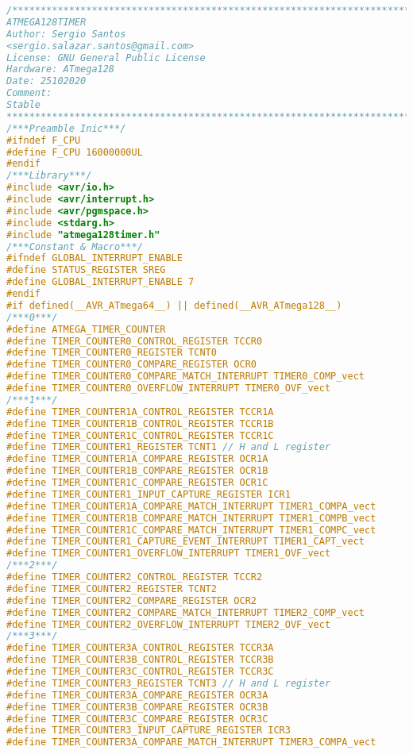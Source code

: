 \begin{lstlisting}[language=C, caption={atmega128timer.c}, label=atmega128timer-c, captionpos=b]
/*************************************************************************
ATMEGA128TIMER
Author: Sergio Santos 
<sergio.salazar.santos@gmail.com>
License: GNU General Public License
Hardware: ATmega128
Date: 25102020
Comment:
Stable
*************************************************************************/
/***Preamble Inic***/
#ifndef F_CPU
#define F_CPU 16000000UL
#endif
/***Library***/
#include <avr/io.h>
#include <avr/interrupt.h>
#include <avr/pgmspace.h>
#include <stdarg.h>
#include "atmega128timer.h"
/***Constant & Macro***/
#ifndef GLOBAL_INTERRUPT_ENABLE
#define STATUS_REGISTER SREG
#define GLOBAL_INTERRUPT_ENABLE 7
#endif
#if defined(__AVR_ATmega64__) || defined(__AVR_ATmega128__)
/***0***/
#define ATMEGA_TIMER_COUNTER
#define TIMER_COUNTER0_CONTROL_REGISTER TCCR0
#define TIMER_COUNTER0_REGISTER TCNT0
#define TIMER_COUNTER0_COMPARE_REGISTER OCR0
#define TIMER_COUNTER0_COMPARE_MATCH_INTERRUPT TIMER0_COMP_vect
#define TIMER_COUNTER0_OVERFLOW_INTERRUPT TIMER0_OVF_vect
/***1***/
#define TIMER_COUNTER1A_CONTROL_REGISTER TCCR1A
#define TIMER_COUNTER1B_CONTROL_REGISTER TCCR1B
#define TIMER_COUNTER1C_CONTROL_REGISTER TCCR1C
#define TIMER_COUNTER1_REGISTER TCNT1 // H and L register
#define TIMER_COUNTER1A_COMPARE_REGISTER OCR1A
#define TIMER_COUNTER1B_COMPARE_REGISTER OCR1B
#define TIMER_COUNTER1C_COMPARE_REGISTER OCR1C
#define TIMER_COUNTER1_INPUT_CAPTURE_REGISTER ICR1
#define TIMER_COUNTER1A_COMPARE_MATCH_INTERRUPT TIMER1_COMPA_vect
#define TIMER_COUNTER1B_COMPARE_MATCH_INTERRUPT TIMER1_COMPB_vect
#define TIMER_COUNTER1C_COMPARE_MATCH_INTERRUPT TIMER1_COMPC_vect
#define TIMER_COUNTER1_CAPTURE_EVENT_INTERRUPT TIMER1_CAPT_vect
#define TIMER_COUNTER1_OVERFLOW_INTERRUPT TIMER1_OVF_vect
/***2***/
#define TIMER_COUNTER2_CONTROL_REGISTER TCCR2
#define TIMER_COUNTER2_REGISTER TCNT2
#define TIMER_COUNTER2_COMPARE_REGISTER OCR2
#define TIMER_COUNTER2_COMPARE_MATCH_INTERRUPT TIMER2_COMP_vect
#define TIMER_COUNTER2_OVERFLOW_INTERRUPT TIMER2_OVF_vect
/***3***/
#define TIMER_COUNTER3A_CONTROL_REGISTER TCCR3A
#define TIMER_COUNTER3B_CONTROL_REGISTER TCCR3B
#define TIMER_COUNTER3C_CONTROL_REGISTER TCCR3C
#define TIMER_COUNTER3_REGISTER TCNT3 // H and L register
#define TIMER_COUNTER3A_COMPARE_REGISTER OCR3A
#define TIMER_COUNTER3B_COMPARE_REGISTER OCR3B
#define TIMER_COUNTER3C_COMPARE_REGISTER OCR3C
#define TIMER_COUNTER3_INPUT_CAPTURE_REGISTER ICR3
#define TIMER_COUNTER3A_COMPARE_MATCH_INTERRUPT TIMER3_COMPA_vect

\end{lstlisting}
